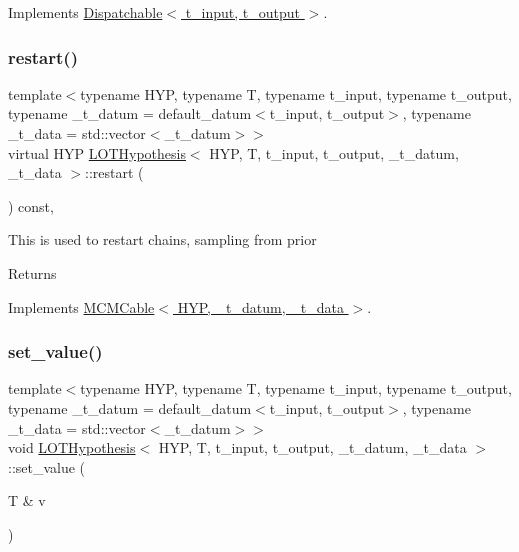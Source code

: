 Implements \hyperlink{class_dispatchable_a9339c2906f7c8dadbe1d0ca79dd9bb11}{Dispatchable$<$ t\+\_\+input, t\+\_\+output $>$}.

\mbox{\label{class_l_o_t_hypothesis_a1224617b004cc10b4c5b17b9da58fbd8}} 
\subsubsection{\texorpdfstring{restart()}{restart()}}
{\footnotesize\ttfamily template$<$typename H\+YP, typename T, typename t\+\_\+input, typename t\+\_\+output, typename \+\_\+t\+\_\+datum = default\+\_\+datum$<$t\+\_\+input, t\+\_\+output$>$, typename \+\_\+t\+\_\+data = std\+::vector$<$\+\_\+t\+\_\+datum$>$$>$ \\
virtual H\+YP \hyperlink{class_l_o_t_hypothesis}{L\+O\+T\+Hypothesis}$<$ H\+YP, T, t\+\_\+input, t\+\_\+output, \+\_\+t\+\_\+datum, \+\_\+t\+\_\+data $>$\+::restart (\begin{DoxyParamCaption}{ }\end{DoxyParamCaption}) const\hspace{0.3cm}{\ttfamily [inline]}, {\ttfamily [virtual]}}

This is used to restart chains, sampling from prior \begin{DoxyReturn}{Returns}

\end{DoxyReturn}


Implements \hyperlink{class_m_c_m_cable_a220d6c4ca73e20441c14fa5bd3e090d3}{M\+C\+M\+Cable$<$ H\+Y\+P, \+\_\+t\+\_\+datum, \+\_\+t\+\_\+data $>$}.

\mbox{\label{class_l_o_t_hypothesis_a873355cca03609ac0ab405d29314e591}} 
\subsubsection{\texorpdfstring{set\+\_\+value()}{set\_value()}\hspace{0.1cm}{\footnotesize\ttfamily [1/2]}}
{\footnotesize\ttfamily template$<$typename H\+YP, typename T, typename t\+\_\+input, typename t\+\_\+output, typename \+\_\+t\+\_\+datum = default\+\_\+datum$<$t\+\_\+input, t\+\_\+output$>$, typename \+\_\+t\+\_\+data = std\+::vector$<$\+\_\+t\+\_\+datum$>$$>$ \\
void \hyperlink{class_l_o_t_hypothesis}{L\+O\+T\+Hypothesis}$<$ H\+YP, T, t\+\_\+input, t\+\_\+output, \+\_\+t\+\_\+datum, \+\_\+t\+\_\+data $>$\+::set\+\_\+value (\begin{DoxyParamCaption}\item[{T \&}]{v }\end{DoxyParamCaption})\hspace{0.3cm}{\ttfamily [inline]}}

